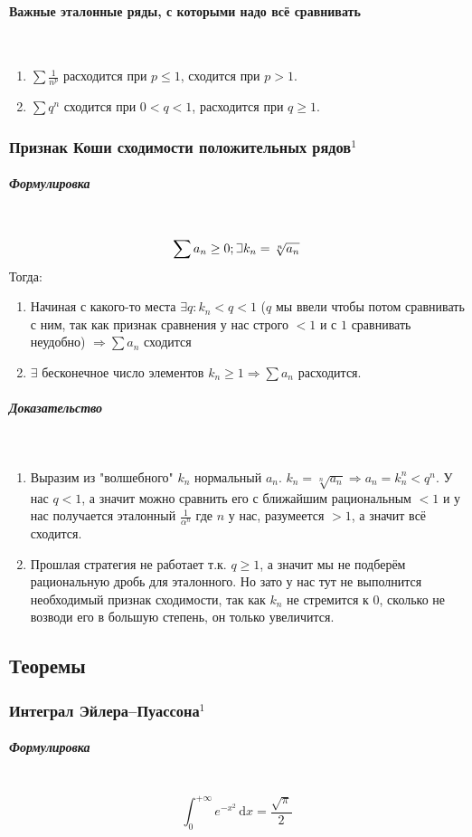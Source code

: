 \documentclass{article}
\def\letus{%
\mathord{\setbox0=\hbox{$\exists$}%
         \hbox{\kern 0.125\wd0%
               \vbox to \ht0{%
                  \hrule width 0.75\wd0%
                  \vfill%
                  \hrule width 0.75\wd0}%
               \vrule height \ht0%
               \kern 0.125\wd0}%
       }%
        }
\def\D{\,\mathrm{d}}
\let\vanillaparagraph\paragraph
\let\vanillasubparagraph\subparagraph
\renewcommand{\paragraph}[1]{\vanillaparagraph{#1}\mbox{}\\}
\renewcommand{\subparagraph}[1]{\vanillasubparagraph{#1}\mbox{}\\}
\begin{document}
\paragraph{Важные эталонные ряды, с которыми надо всё сравнивать}
\begin{enumerate}
    \item $\sum \frac{1}{n^p}$ расходится при $p \le 1$, сходится при $p > 1$.
    \item $\sum q^n$ сходится при $0 < q < 1$, расходится при $q \ge 1$.
\end{enumerate}

\subsubsection{Признак Коши сходимости положительных рядов\texorpdfstring{$^1$}{}}
\label{КошиРяды}
\subparagraph{Формулировка}
$$
\sum a_n \ge 0; \letus k_n = \sqrt[n]{a_n}
$$
Тогда:
\begin{enumerate}
    \item Начиная с какого-то места $\exists q : k_n < q < 1$ ($q$ мы ввели чтобы потом сравнивать с ним, так как признак сравнения у нас строго $<1$ и с $1$ сравнивать неудобно) $\Rightarrow \sum a_n$ сходится
    \item $\exists$ бесконечное число элементов $k_n \ge 1 \Rightarrow \sum a_n$ расходится.
\end{enumerate}

\subparagraph{Доказательство}
\begin{enumerate}
    \item Выразим из "волшебного" $k_n$ нормальный $a_n$. $k_n = \sqrt[n]{a_n} \Rightarrow a_n = k_n^n < q^n$. У нас $q < 1$, а значит можно сравнить его с ближайшим рациональным $<1$ и у нас получается эталонный $\frac{1}{\alpha^n}$ где $n$ у нас, разумеется $> 1$, а значит всё сходится.
    \item Прошлая стратегия не работает т.к. $q \ge 1$, а значит мы не подберём рациональную дробь для эталонного. Но зато у нас тут не выполнится необходимый признак сходимости, так как $k_n$ не стремится к 0, сколько не возводи его в большую степень, он только увеличится.
\end{enumerate}

\newpage
\subsection{Теоремы}
\subsubsection{Интеграл Эйлера--Пуассона\texorpdfstring{$^1$}{}}\label{ИЭП}
\subparagraph{Формулировка}
$$
\int_0^{+\infty}e^{-x^2}\D x = \frac{\sqrt{\pi}}{2}
$$
\end{document}
